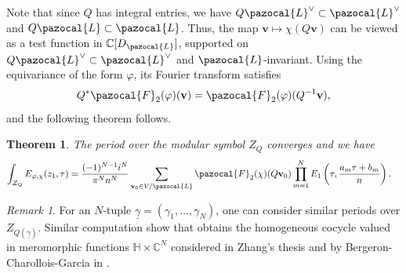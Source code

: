 \documentclass[a4paper,11pt]{amsart} %
\newcommand{\8}{\infty}
\newcommand{\vbf}{\mathbf{v}}
\newcommand{\four}{\pazocal{F}}
\newcommand{\HH}{\mathbb{H}}
\newcommand{\C}{\mathbb{C}}
\newcommand{\Lcal}{\pazocal{L}}
\theoremstyle{mytheoremstyle}
\newtheorem{thm}{Theorem}[section]
\theoremstyle{remark}
\newtheorem{rmk}{Remark}[section]
\numberwithin{equation}{section}
\begin{document}
Note that since $Q$ has integral entries, we have $Q\Lcal^\vee \subset \Lcal^\vee$ and $Q\Lcal \subset \Lcal$. Thus, the map $\vbf \mapsto \chi(Q\vbf)$ can be viewed as a test function in $\C[D_\Lcal]$, supported on $Q\Lcal^\vee \subset \Lcal^\vee$ and $\Lcal$-invariant. Using the equivariance of the form $\varphi$, its Fourier transform satisfies
\begin{align}
Q^\ast \four_2(\varphi)(\vbf)=\four_2(\varphi)(Q^{-1}\vbf),
\end{align}
and the following theorem follows.

\begin{thm} The period over the modular symbol $Z_Q$ converges and we have
\begin{align}
\int_{Z_Q} E_{\varphi, \chi}(z_1,\tau)& = \frac{(-1)^{N-1}i^N}{\pi^{N}n^{N}} \sum_{\vbf_0 \in V/\Lcal}\four_2(\chi)(Q\vbf_0) \prod_{m=1}^N E_1\left (\tau,\frac{a_m\tau+b_m}{n} \right ).
\end{align}
\end{thm}


\begin{rmk} For an $N$-tuple $\underline{\gamma}=(\gamma_1, \dots, \gamma_N)$, one can consider similar periods over $Z_{Q(\underline{\gamma})}$. Similar computation show that obtains the homogeneous cocycle valued in meromorphic functions $\HH \times \C^N$ considered in Zhang's thesis \cite[Section.~4.1.1]{haozhang} and by Bergeron-Charollois-Garcia in \cite[Theorem.~2.10]{bcgcrm}.
\end{rmk}
\end{document}
